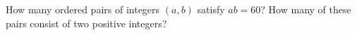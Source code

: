 How many ordered pairs of integers $(a,b)$ satisfy $ab=60$? How many of these pairs consist of two positive integers?
